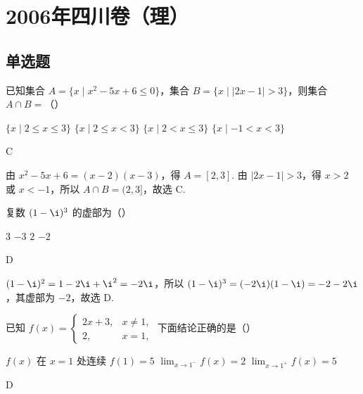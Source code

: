 \chapter{2006年四川卷（理）}
\section{单选题}
\begin{problem}
已知集合 \(A = \{x \mid x^2 - 5x + 6 \leqslant 0\}\)，集合 \(B = \{x \mid |2x - 1| > 3\}\)，则集合 \(A \cap B =\)（\quad）

\choices
    {\(\{x\mid 2\leqslant x\leqslant 3\}\)}
    {\(\{x\mid 2\leqslant x < 3\}\)}
    {\(\{x\mid 2 < x\leqslant 3\}\)}
    {\(\{x\mid -1 < x < 3\}\)}
\end{problem}

\begin{answer}
C
\end{answer}

\begin{solution}
由 \(x^2-5x+6=(x-2)(x-3)\)，得 \(A=[2,3]\). 由 \(|2x-1|>3\)，得 \(x>2\) 或 \(x<-1\)，所以 \(A\cap B=(2,3]\)，故选 C.
\end{solution}

\begin{problem}
复数 \((1 - \i)^3\) 的虚部为（\quad）

\choices
    {\(3\)}
    {\(-3\)}
    {\(2\)}
    {\(-2\)}
\end{problem}

\begin{answer}
D
\end{answer}

\begin{solution}
\((1-\i)^2=1-2\i+\i^2=-2\i\)，所以 \((1-\i)^3=(-2\i)(1-\i)=-2-2\i\)，其虚部为 \(-2\)，故选 D.
\end{solution}

\begin{problem}
已知 \(f(x)=\begin{cases}
2x+3, & x\ne 1,\\
2, & x=1,
\end{cases}\) 下面结论正确的是（\quad）

\choices
    {\(f(x)\) 在 \(x = 1\) 处连续}
    {\(f(1) = 5\)}
    {\(\displaystyle\lim_{x\to 1^{-}}f(x) = 2\)}
    {\(\displaystyle\lim_{x\to 1^{+}}f(x) = 5\)}
\end{problem}

\begin{answer}
D
\end{answer}

